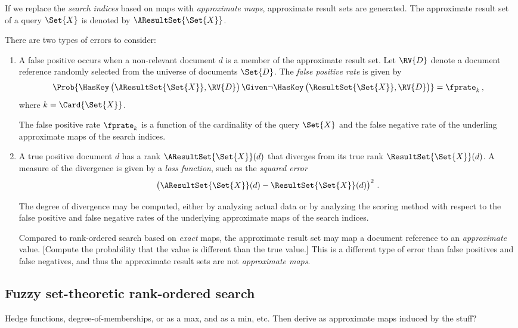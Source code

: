 \documentclass[ ../main.tex]{subfiles}
\begin{document}
If we replace the \emph{search indices} based on maps with \emph{approximate maps}, approximate result sets are generated. The approximate result set of a query $\Set{X}$ is denoted by $\AResultSet{\Set{X}}$.

There are two types of errors to consider:
\begin{enumerate}
    \item A false positive occurs when a non-relevant document $d$ is a member of the approximate result set. Let $\RV{D}$ denote a document reference randomly selected from the universe of documents $\Set{D}$. The \emph{false positive rate} is given by
    \begin{equation}
        \Prob{\HasKey\left(\AResultSet{\Set{X}}, \RV{D}\right) \Given \neg \HasKey\left(\ResultSet{\Set{X}}, \RV{D}\right)} = \fprate_k\,,
    \end{equation}
    where $k = \Card{\Set{X}}$.
    
    The false positive rate $\fprate_k$ is a function of the cardinality of the query $\Set{X}$ and the false negative rate of the underling approximate maps of the search indices.

    \item A true positive document $d$ has a rank $\AResultSet{\Set{X}}(d)$ that diverges from its true rank $\ResultSet{\Set{X}}(d)$. A measure of the divergence is given by a \emph{loss function}, such as the \emph{squared error}
    \begin{equation}
        \left(\AResultSet{\Set{X}}(d) - \ResultSet{\Set{X}}(d)\right)^2\,.
    \end{equation}
    
    The degree of divergence may be computed, either by analyzing actual data or by analyzing the scoring method with respect to the false positive and false negative rates of the underlying approximate maps of the search indices.

    Compared to rank-ordered search based on \emph{exact} maps, the approximate result set may map a document reference to an \emph{approximate} value. [Compute the probability that the value is different than the true value.]  This is a different type of error than false positives and false negatives, and thus the approximate result sets are not \emph{approximate maps}.
\end{enumerate}

\subsection{Fuzzy set-theoretic rank-ordered search}
Hedge functions, degree-of-memberships, or as a max, and as a min, etc. Then derive as approximate maps induced by the stuff?
\end{document}
